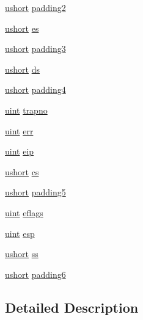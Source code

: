 \begin{DoxyCompactItemize}
\hyperlink{types_8h_ab95f123a6c9bcfee6a343170ef8c5f69}{ushort} \hyperlink{structtrapframe_a352099edda0c7698cf5f352878346448}{padding2}
\item 
\hyperlink{types_8h_ab95f123a6c9bcfee6a343170ef8c5f69}{ushort} \hyperlink{structtrapframe_a926406c155a1238da40552b902622ab2}{es}
\item 
\hyperlink{types_8h_ab95f123a6c9bcfee6a343170ef8c5f69}{ushort} \hyperlink{structtrapframe_a1d1a645b86f97ca1844887d6178675aa}{padding3}
\item 
\hyperlink{types_8h_ab95f123a6c9bcfee6a343170ef8c5f69}{ushort} \hyperlink{structtrapframe_a0d354e57548a3fa1b2f8ab075a9bcb7e}{ds}
\item 
\hyperlink{types_8h_ab95f123a6c9bcfee6a343170ef8c5f69}{ushort} \hyperlink{structtrapframe_a2b559818ffd02a68e4d5ac320237a025}{padding4}
\item 
\hyperlink{types_8h_a91ad9478d81a7aaf2593e8d9c3d06a14}{uint} \hyperlink{structtrapframe_ac8d91601c2d3153426c4f2dd2949d359}{trapno}
\item 
\hyperlink{types_8h_a91ad9478d81a7aaf2593e8d9c3d06a14}{uint} \hyperlink{structtrapframe_a72c1299c81cb92b474caf193d7672dd8}{err}
\item 
\hyperlink{types_8h_a91ad9478d81a7aaf2593e8d9c3d06a14}{uint} \hyperlink{structtrapframe_ae590d07d633d3642402cd0b25e053568}{eip}
\item 
\hyperlink{types_8h_ab95f123a6c9bcfee6a343170ef8c5f69}{ushort} \hyperlink{structtrapframe_a2c1a506f83f7be334e4128748f4a2eaa}{cs}
\item 
\hyperlink{types_8h_ab95f123a6c9bcfee6a343170ef8c5f69}{ushort} \hyperlink{structtrapframe_aa4adb792df4544b351afdded07baba05}{padding5}
\item 
\hyperlink{types_8h_a91ad9478d81a7aaf2593e8d9c3d06a14}{uint} \hyperlink{structtrapframe_a96d2765012333ea2615dda6ac2521d61}{eflags}
\item 
\hyperlink{types_8h_a91ad9478d81a7aaf2593e8d9c3d06a14}{uint} \hyperlink{structtrapframe_a4c294ae59a559d723bad6c161be04168}{esp}
\item 
\hyperlink{types_8h_ab95f123a6c9bcfee6a343170ef8c5f69}{ushort} \hyperlink{structtrapframe_aa518aeb56634c5237632789fbe00b635}{ss}
\item 
\hyperlink{types_8h_ab95f123a6c9bcfee6a343170ef8c5f69}{ushort} \hyperlink{structtrapframe_a79f9b7c8cb0db73082d203bd85b262b7}{padding6}
\end{DoxyCompactItemize}


\subsection{Detailed Description}


